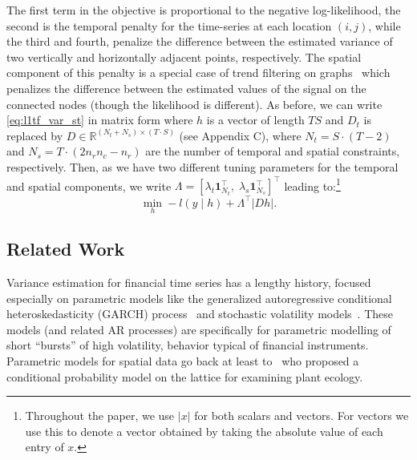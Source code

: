 \documentclass[letterpaper]{article} %
\newcommand{\one}{\mathbf{1}}
\newcommand{\given}{\;\vert\;}
\begin{document}
The first term in the objective is proportional to the negative
log-likelihood, the second is the temporal penalty for the
time-series at each location $(i,j)$, while the third and fourth,
penalize the difference between the estimated variance of two
vertically and horizontally adjacent points, respectively. The spatial
component of this
penalty is a special case of trend filtering on
graphs~\cite{WangSharpnack2016} which penalizes the difference between
the estimated values of the signal on the connected nodes (though the
likelihood is different). As before,
we can write \eqref{eq:l1tf_var_st} in matrix form where $h$ is a
vector of length
$TS$ and $D_t$ is replaced by $D \in
\mathbb{R}^{(N_t+N_s) \times (T \cdot S)	}$ (see Appendix C), where $N_t=S \cdot
(T-2)$ and $N_s=T \cdot (2n_rn_c-n_r)$ are the number of temporal and
spatial constraints, respectively. 
Then, as we have two different tuning parameters
for the temporal and spatial components, we write $\Lambda
=\left[\lambda_t\one_{N_t}^\top,\;
  \lambda_s\one_{N_s}^\top\right]^\top$ leading
to:\footnote{Throughout the paper, we use $|x|$ for both scalars and
  vectors. For vectors we use this to denote a vector obtained by
  taking the absolute value of each entry of $x$.}  
\begin{equation}
\min_h -l(y\given h)+ \Lambda^\top | Dh |.
\label{eq:l1tf_var_st_mat}
\end{equation}

\subsection{Related Work}

Variance estimation for financial time series has a lengthy history,
focused especially on parametric models like the generalized
autoregressive conditional heteroskedasticity (GARCH) process~\cite{engle2002dynamic} and
stochastic volatility models~\cite{HarveyRuiz1994}. These models (and
related AR processes) are specifically for parametric modelling of
short ``bursts'' of high volatility, behavior typical of financial
instruments. Parametric models for spatial data go back at least
to~\cite{besag1974spatial} who proposed a conditional probability
model on the lattice for examining plant ecology.
\end{document}

